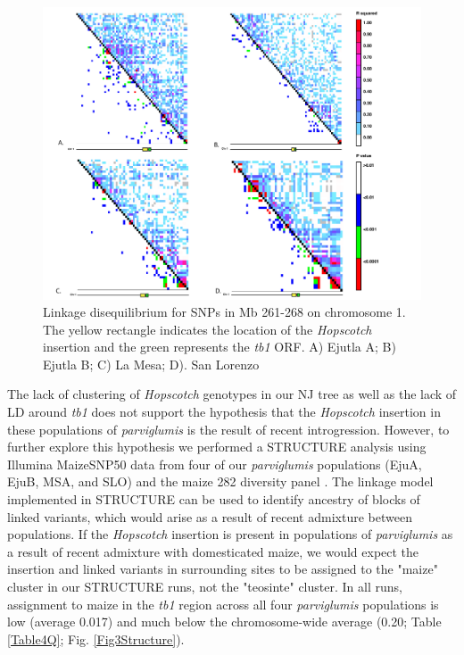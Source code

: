 \documentclass[11pt]{article}
\begin{document}
\begin{linenumbers}
\begin{flushleft}
\begin{figure}[!t]
  \begin{center}
   \includegraphics[width=140mm]{Fig2LDPlots.pdf}
    \caption{Linkage disequilibrium for SNPs in Mb 261-268 on chromosome 1. The yellow rectangle indicates the location of the \emph{Hopscotch} insertion and the green represents the \emph{tb1} ORF. A) Ejutla A; B) Ejutla B; C) La Mesa; D). San Lorenzo} 
\label{Fig2LD}
  \end{center}
\end{figure}

The lack of clustering of \emph{Hopscotch} genotypes in our NJ tree as well as the lack of LD around \emph{tb1} does not support the hypothesis that the \emph{Hopscotch} insertion in these populations of \emph{parviglumis} is the result of recent introgression. However, to further explore this hypothesis we performed a STRUCTURE analysis using Illumina MaizeSNP50 data from four of our \emph{parviglumis} populations (EjuA, EjuB, MSA, and SLO) and the maize 282 diversity panel \citep{Cook2012, Pyhajarvi2013}. The linkage model implemented in STRUCTURE can be used to identify ancestry of blocks of linked variants, which would arise as a result of recent admixture between populations. If the \emph{Hopscotch} insertion is present in populations of \emph{parviglumis} as a result of recent admixture with domesticated maize, we would expect the insertion and linked variants in surrounding sites to be assigned to the "maize" cluster in our STRUCTURE runs, not the "teosinte" cluster. In all runs, assignment to maize in the \emph{tb1} region across all four \emph{parviglumis} populations is low (average 0.017) and much below the chromosome-wide average (0.20; Table \ref{Table4Q}; Fig. \ref{Fig3Structure}). 


\end{flushleft}
\end{linenumbers}
\end{document}
